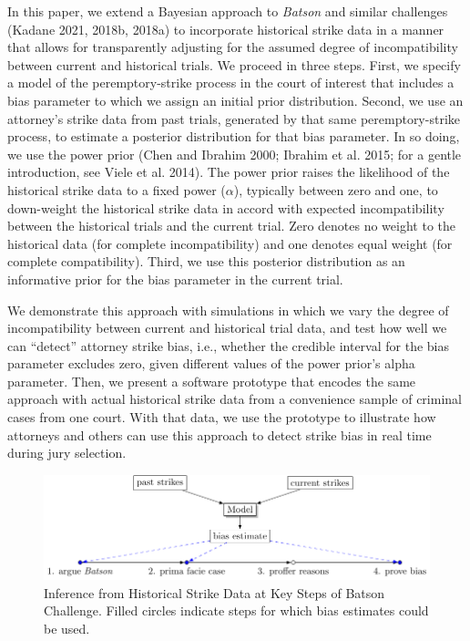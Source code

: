\documentclass[12pt]{article}
\begin{document}
In this paper, we extend a Bayesian approach to \emph{Batson} and similar challenges (Kadane 2021, 2018b, 2018a) to incorporate historical strike data in a manner that allows for transparently adjusting for the assumed degree of incompatibility between current and historical trials. We proceed in three steps. First, we specify a model of the peremptory-strike process in the court of interest that includes a bias parameter to which we assign an initial prior distribution. Second, we use an attorney's strike data from past trials, generated by that same peremptory-strike process, to estimate a posterior distribution for that bias parameter. In so doing, we use the power prior (Chen and Ibrahim 2000; Ibrahim et al. 2015; for a gentle introduction, see Viele et al. 2014). The power prior raises the likelihood of the historical strike data to a fixed power (\(\alpha\)), typically between zero and one, to down-weight the historical strike data in accord with expected incompatibility between the historical trials and the current trial. Zero denotes no weight to the historical data (for complete incompatibility) and one denotes equal weight (for complete compatibility). Third, we use this posterior distribution as an informative prior for the bias parameter in the current trial.

We demonstrate this approach with simulations in which we vary the degree of incompatibility between current and historical trial data, and test how well we can ``detect'' attorney strike bias, i.e., whether the credible interval for the bias parameter excludes zero, given different values of the power prior's alpha parameter. Then, we present a software prototype that encodes the same approach with actual historical strike data from a convenience sample of criminal cases from one court. With that data, we use the prototype to illustrate how attorneys and others can use this approach to detect strike bias in real time during jury selection.

\begin{figure}[h]

{\centering \includegraphics[width=1\linewidth]{../figures/batson_workflow_fig2} 

}

\caption{Inference from Historical Strike Data at Key Steps of Batson Challenge. Filled circles indicate steps for which bias estimates could be used.}\label{fig:batsonworkflowfig}
\end{figure}
\end{document}
